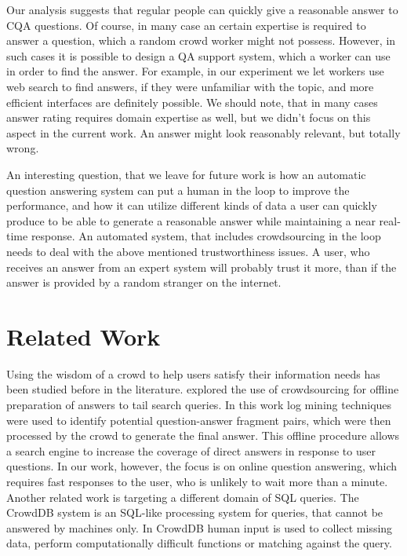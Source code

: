 \documentclass[11pt,letterpaper]{article}
\begin{document}
Our analysis suggests that regular people can quickly give a reasonable answer to CQA questions.
Of course, in many case an certain expertise is required to answer a question, which a random crowd worker might not possess.
However, in such cases it is possible to design a QA support system, which a worker can use in order to find the answer.
For example, in our experiment we let workers use web search to find answers, if they were unfamiliar with the topic, and more efficient interfaces are definitely possible.
We should note, that in many cases answer rating requires domain expertise as well, but we didn't focus on this aspect in the current work.
An answer might look reasonably relevant, but totally wrong.

An interesting question, that we leave for future work is how an automatic question answering system can put a human in the loop to improve the performance, and how it can utilize different kinds of data a user can quickly produce to be able to generate a reasonable answer while maintaining a near real-time response.
An automated system, that includes crowdsourcing in the loop needs to deal with the above mentioned trustworthiness issues.
A user, who receives an answer from an expert system will probably trust it more, than if the answer is provided by a random stranger on the internet.


\section{Related Work}
\label{sec:related_work}

Using the wisdom of a crowd to help users satisfy their information needs has been studied before in the literature.
\cite{bernstein2012direct} explored the use of crowdsourcing for offline preparation of answers to tail search queries.
In this work log mining techniques were used to identify potential question-answer fragment pairs, which were then processed by the crowd to generate the final answer.
This offline procedure allows a search engine to increase the coverage of direct answers in response to user questions.
In our work, however, the focus is on online question answering, which requires fast responses to the user, who is unlikely to wait more than a minute.
Another related work is targeting a different domain of SQL queries.
The CrowdDB system \cite{franklin2011crowddb} is an SQL-like processing system for queries, that cannot be answered by machines only.
In CrowdDB human input is used to collect missing data, perform computationally difficult functions or matching against the query.
\end{document}
